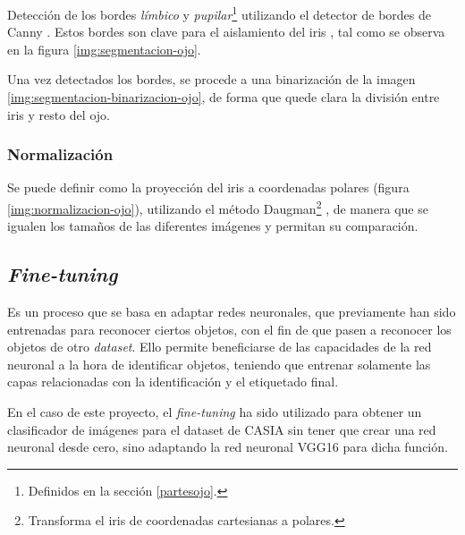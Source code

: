 Detección de los bordes \textit{límbico} y \textit{pupilar}\footnote{Definidos en la sección \ref{partesojo}.} utilizando el detector de bordes de Canny \cite{4767851}. Estos bordes son clave para el aislamiento del iris \cite{tfg_iris_2020}, tal como se observa en la figura \ref{img:segmentacion-ojo}.



Una vez detectados los bordes, se procede a una binarización de la imagen \ref{img:segmentacion-binarizacion-ojo}, de forma que quede clara la división entre iris y resto del ojo.



\subsubsection{Normalización}\label{subsubsec:normalizacion}

Se puede definir como la proyección del iris a coordenadas polares (figura \ref{img:normalizacion-ojo}), utilizando el método Daugman\footnote{Transforma el iris de coordenadas cartesianas a polares.} \cite{daugman_normalization_1993}, de manera que se igualen los tamaños de las diferentes imágenes y permitan su comparación.



\subsection{\textit{Fine-tuning}}\label{subsec:fine-tuning}
 Es un proceso que se basa en adaptar redes neuronales, que previamente han sido entrenadas para reconocer ciertos objetos, con el fin de que pasen a reconocer los objetos de otro \textit{dataset}. 
 Ello permite beneficiarse de las capacidades de la red neuronal a la hora de identificar objetos, teniendo que entrenar solamente las capas relacionadas con la identificación y el etiquetado final. 
 
 En el caso de este proyecto, el \textit{fine-tuning} ha sido utilizado para obtener un clasificador de imágenes para el dataset de CASIA sin tener que crear una red neuronal desde cero, sino adaptando la red
  neuronal VGG16 para dicha función.

